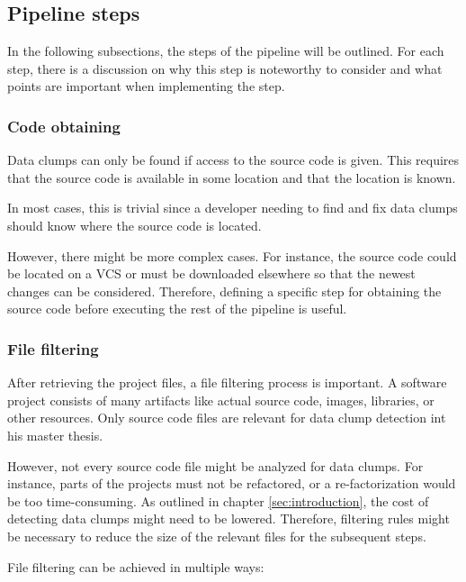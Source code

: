 \subsection{Pipeline steps}\label{sec:pipeline_steps}
In the following subsections, the steps of the pipeline will be outlined. For each step, there is a discussion on why this step is noteworthy to consider and what points are important when implementing the step.
\subsubsection{Code obtaining}\label{sec:code_obtaining}
Data clumps can only be found if access to the source code is given. This requires that the source code is available in some location and that the location is known.

In most cases, this is trivial since a developer needing to find and fix data clumps should know where the source code is located.

However, there might be more complex cases. For instance, the source code could be located on a \ac{VCS} or must be downloaded elsewhere so that the newest changes can be considered. Therefore, defining a specific step for obtaining the source code before executing the rest of the pipeline is useful. 


\subsubsection{File filtering}\label{subsub:filtering_files}
After retrieving the project files, a file filtering process is important. A software project consists of many artifacts like actual source code, images, libraries, or other resources. Only source code files are relevant for data clump detection int his master thesis. 


However, not every source code file might be analyzed for data clumps. For instance, parts of the projects must not be refactored, or a re-factorization would be too time-consuming. As outlined in chapter \ref{sec:introduction}, the cost of detecting data clumps might need to be lowered. Therefore, filtering rules might be necessary to reduce the size of the relevant files for the subsequent steps.  

File filtering can be achieved in multiple ways:

